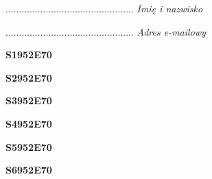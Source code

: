 \begin{turn}{90}\begin{minipage}{\linewidth} \vspace{20mm} ................................................  \textit{Imię i nazwisko}\end{minipage}\end{turn}

\begin{turn}{90}\begin{minipage}{\linewidth} \vspace{20mm} ................................................  \textit{Adres e-mailowy}\end{minipage}\end{turn}

\begin{turn}{90}\huge \begin{minipage}{\linewidth} \vspace{10mm}\textbf{S1952E70}\end{minipage}\end{turn}

\begin{turn}{90}\huge \begin{minipage}{\linewidth} \vspace{10mm}\textbf{S2952E70}\end{minipage}\end{turn}

\begin{turn}{90}\huge \begin{minipage}{\linewidth} \vspace{10mm}\textbf{S3952E70}\end{minipage}\end{turn}

\begin{turn}{90}\huge \begin{minipage}{\linewidth} \vspace{10mm}\textbf{S4952E70}\end{minipage}\end{turn}

\begin{turn}{90}\huge \begin{minipage}{\linewidth} \vspace{10mm}\textbf{S5952E70}\end{minipage}\end{turn}

\begin{turn}{90}\huge \begin{minipage}{\linewidth} \vspace{10mm}\textbf{S6952E70}\end{minipage}\end{turn}

